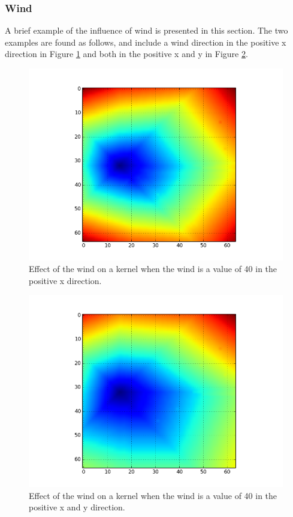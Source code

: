 \subsubsection{Wind}\label{sec:wind}
A brief example of the influence of wind is presented in this section. The two examples are found as follows, and include a wind direction in the positive x direction in Figure \ref{fig:wind} and both in the positive x and y in Figure \ref{fig:wind_both}. 
\begin{figure}[H]
\centering
  \includegraphics[height=.4\textheight]{figures/results/40_wind.png}
  \caption{Effect of the wind on a kernel when the wind is a value of 40 in the positive x direction.}
  \label{fig:wind}
\end{figure}  
\begin{figure}[H]
\centering
  \includegraphics[height=.4\textheight]{figures/results/40_40_wind.png}
  \caption{Effect of the wind on a kernel when the wind is a value of 40 in the positive x and y direction.}
  \label{fig:wind_both}
\end{figure} 

